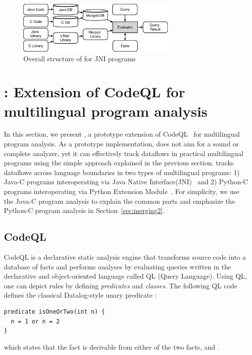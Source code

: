 \begin{figure}[t]
  \centering
  \vspace{2mm}
  \includegraphics[width=0.7\textwidth]{img/codeql.pdf}
  \caption{Overall structure of \ours for JNI programs}
  \label{fig:codeql}
\end{figure}

\section{\ours: Extension of CodeQL for multilingual program analysis}\label{sec:impl}
In this section, we present \ours, a prototype extension of
CodeQL~\cite{codeql} for multilingual program analysis.
As a prototype implementation, \ours does not aim for a sound or complete
analyzer, yet it can effectively track dataflows in practical multilingual
programs using the simple approach explained in the previous section.
\ours tracks dataflows
across language boundaries in two types of multilingual programs: 1) Java-C
programs interoperating via Java Native Interface(JNI)~\cite{jnispec} and 2)
Python-C programs interoperating via Python Extension Module~\cite{pyext}.  For
simplicity, we use the Java-C program analysis to explain the common parts and
emphasize the Python-C program analysis in Section~\ref{sec:merging2}.


\subsection{CodeQL}
CodeQL is a declarative static analysis engine that transforms source code into
a database of facts and performs analyses by evaluating queries written in the
declarative and object-oriented language called QL (Query Language). Using QL,
one can depict rules by defining \textit{ predicates} and \textit{ classes}. The following
QL code defines the classical Datalog-style unary predicate :

\begin{lstlisting}[style=codeql,xleftmargin=2.5em]
predicate isOneOrTwo(int n) {
  n = 1 or n = 2
}
\end{lstlisting}

\noindent
which states that the fact  is derivable from either
of the two facts,  and .

